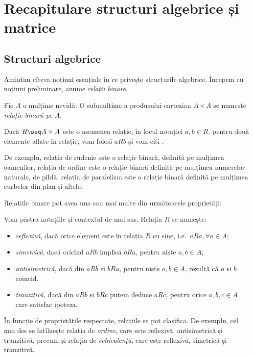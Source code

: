 \chapter{Recapitulare structuri algebrice și matrice}

\section{Structuri algebrice}

Amintim cîteva noțiuni esențiale în ce privește structurile algebrice. Începem
cu noțiuni preliminare, anume \emph{relații binare}.

\begin{definition}\label{def:rel-bin} 
  Fie $ A $ o mulțime nevidă. O submulțime a produsului cartezian $ A \times A $
  se numește \emph{relație binară pe $ A $}.
\end{definition}

Dacă $ R \seq A \times A $ este o asemenea relație, în locul notației
$ a, b \in R $, pentru două elemente aflate în relație, vom folosi $ a R b $ și
vom citi .

De exemplu, relația de rudenie este o relație binară, definită pe mulțimea oamenilor,
relația de ordine este o relație binară definită pe mulțimea numerelor naturale, de
pildă, relația de paralelism este o relație binară definită pe mulțimea curbelor din
plan și altele.

Relațiile binare pot avea una sau mai multe din următoarele proprietăți:

Vom păstra notațiile și contextul de mai sus. Relația $R$ se numește:
\begin{itemize}  
   
  \item \emph{reflexivă}, dacă orice element este în relația $R$ cu sine, i.e.\
    $a R a, \forall a \in A$;
  \item \emph{simetrică}, dacă oricînd $a R b$ implică $b R a$, pentru niște $a, b \in A$;
  \item \emph{antisimetrică}, dacă din $a R b$ și $b R a$, pentru niște $a, b \in A$,  
    rezultă că $a$ și $b$ coincid.
  \item \emph{tranzitivă}, dacă din $a R b$ și $b R c$ putem deduce $a R c$, pentru orice
    $a, b, c \in A$ care satisfac ipoteza.
\end{itemize}
 
În funcție de proprietățile respectate, relațiile se pot clasifica. De exemplu, cel mai des
se întîlnește relația de \emph{ordine}, care este reflexivă, antisimetrică și tranzitivă,
precum și relația de \emph{echivalență}, care este reflexivă, simetrică și tranzitivă.

